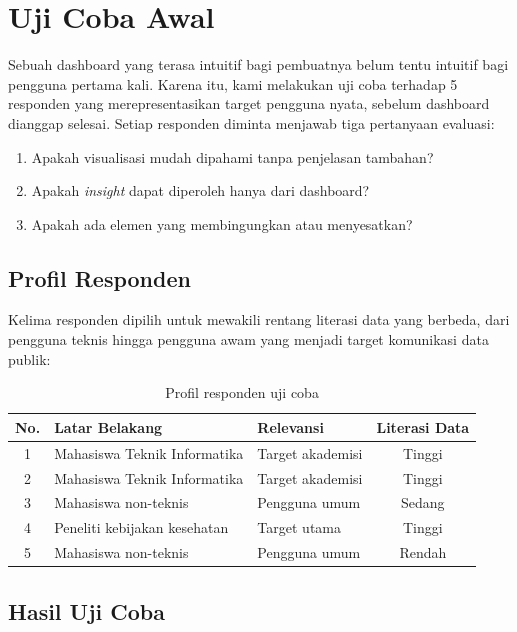 \section{Uji Coba Awal}

Sebuah dashboard yang terasa intuitif bagi pembuatnya belum tentu intuitif bagi pengguna pertama kali. Karena itu, kami melakukan uji coba terhadap 5 responden yang merepresentasikan target pengguna nyata, sebelum dashboard dianggap selesai. Setiap responden diminta menjawab tiga pertanyaan evaluasi:

\begin{enumerate}
  \item Apakah visualisasi mudah dipahami tanpa penjelasan tambahan?
  \item Apakah \textit{insight} dapat diperoleh hanya dari dashboard?
  \item Apakah ada elemen yang membingungkan atau menyesatkan?
\end{enumerate}

\subsection{Profil Responden}

Kelima responden dipilih untuk mewakili rentang literasi data yang berbeda, dari pengguna teknis hingga pengguna awam yang menjadi target komunikasi data publik:

\begin{table}[H]
\centering
\caption{Profil responden uji coba}
\renewcommand{\arraystretch}{1.3}
\begin{tabularx}{\textwidth}{@{}clXc@{}}
\toprule
\textbf{No.} & \textbf{Latar Belakang} & \textbf{Relevansi} & \textbf{Literasi Data} \\
\midrule
1 & Mahasiswa Teknik Informatika & Target akademisi & Tinggi \\
2 & Mahasiswa Teknik Informatika & Target akademisi & Tinggi \\
3 & Mahasiswa non-teknis & Pengguna umum & Sedang \\
4 & Peneliti kebijakan kesehatan & Target utama & Tinggi \\
5 & Mahasiswa non-teknis & Pengguna umum & Rendah \\
\bottomrule
\end{tabularx}
\end{table}

\subsection{Hasil Uji Coba}

